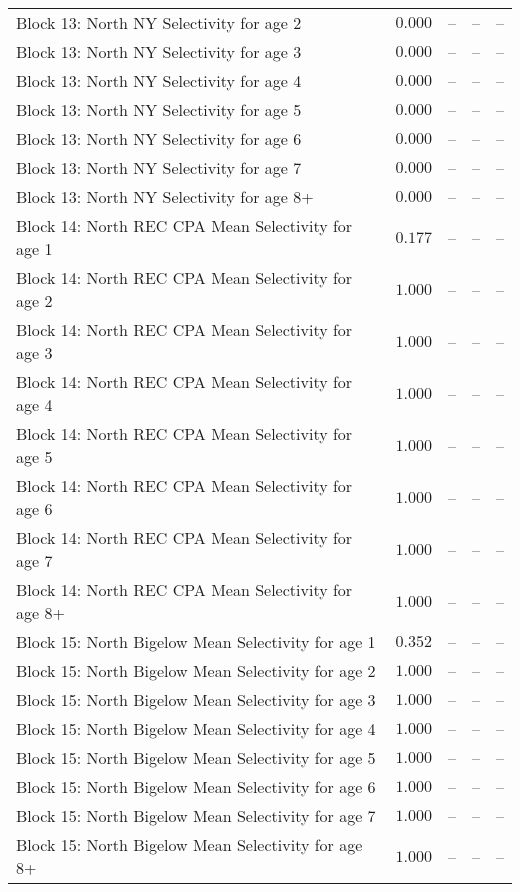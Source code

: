 \documentclass[
]{article}
\begin{document}
\begin{landscape}
\begin{longtable}[t]{lrrrr}
Block 13: North NY Selectivity for age 2 & $0.000$ & -- & -- & --\\
\addlinespace
Block 13: North NY Selectivity for age 3 & $0.000$ & -- & -- & --\\
Block 13: North NY Selectivity for age 4 & $0.000$ & -- & -- & --\\
Block 13: North NY Selectivity for age 5 & $0.000$ & -- & -- & --\\
Block 13: North NY Selectivity for age 6 & $0.000$ & -- & -- & --\\
Block 13: North NY Selectivity for age 7 & $0.000$ & -- & -- & --\\
\addlinespace
Block 13: North NY Selectivity for age 8+ & $0.000$ & -- & -- & --\\
Block 14: North REC CPA Mean Selectivity for age 1 & $0.177$ & -- & -- & --\\
Block 14: North REC CPA Mean Selectivity for age 2 & $1.000$ & -- & -- & --\\
Block 14: North REC CPA Mean Selectivity for age 3 & $1.000$ & -- & -- & --\\
Block 14: North REC CPA Mean Selectivity for age 4 & $1.000$ & -- & -- & --\\
\addlinespace
Block 14: North REC CPA Mean Selectivity for age 5 & $1.000$ & -- & -- & --\\
Block 14: North REC CPA Mean Selectivity for age 6 & $1.000$ & -- & -- & --\\
Block 14: North REC CPA Mean Selectivity for age 7 & $1.000$ & -- & -- & --\\
Block 14: North REC CPA Mean Selectivity for age 8+ & $1.000$ & -- & -- & --\\
Block 15: North Bigelow Mean Selectivity for age 1 & $0.352$ & -- & -- & --\\
\addlinespace
Block 15: North Bigelow Mean Selectivity for age 2 & $1.000$ & -- & -- & --\\
Block 15: North Bigelow Mean Selectivity for age 3 & $1.000$ & -- & -- & --\\
Block 15: North Bigelow Mean Selectivity for age 4 & $1.000$ & -- & -- & --\\
Block 15: North Bigelow Mean Selectivity for age 5 & $1.000$ & -- & -- & --\\
Block 15: North Bigelow Mean Selectivity for age 6 & $1.000$ & -- & -- & --\\
\addlinespace
Block 15: North Bigelow Mean Selectivity for age 7 & $1.000$ & -- & -- & --\\
Block 15: North Bigelow Mean Selectivity for age 8+ & $1.000$ & -- & -- & --\\

\end{longtable}
\end{landscape}
\end{document}
